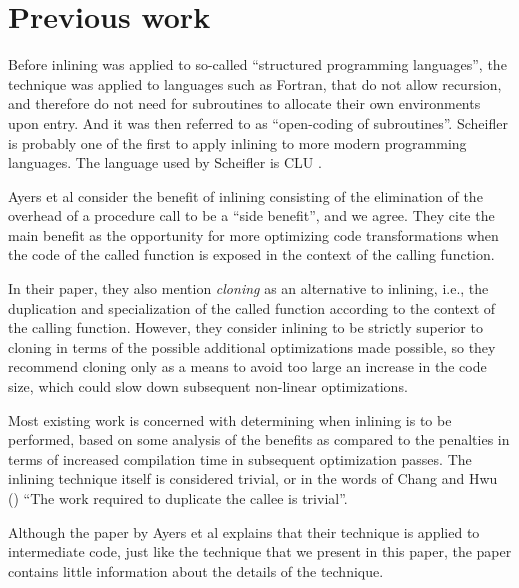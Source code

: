 \section{Previous work}

Before inlining was applied to so-called ``structured programming
languages'', the technique was applied to languages such as Fortran,
that do not allow recursion, and therefore do not need for subroutines
to allocate their own environments upon entry.  And it was then
referred to as ``open-coding of subroutines''.  Scheifler
\cite{Scheifler:1977:AIS:359810.359830} is probably one of the first
to apply inlining to more modern programming languages.  The language
used by Scheifler is CLU \cite{Liskov:1977:AMC:359763.359789}.

Ayers et al \cite{Ayers:1997:AI:258915.258928} consider the benefit of
inlining consisting of the elimination of the overhead of a procedure
call to be a ``side benefit'', and we agree.  They cite the main
benefit as the opportunity for more optimizing code transformations
when the code of the called function is exposed in the context of the
calling function.

In their paper, they also mention \emph{cloning} as an alternative to
inlining, i.e., the duplication and specialization of the called
function according to the context of the calling function.  However,
they consider inlining to be strictly superior to cloning in terms of
the possible additional optimizations made possible, so they recommend
cloning only as a means to avoid too large an increase in the code
size, which could slow down subsequent non-linear optimizations.

Most existing work is concerned with determining when inlining is to
be performed, based on some analysis of the benefits as compared to
the penalties in terms of increased compilation time in subsequent
optimization passes.  The inlining technique itself is considered
trivial, or in the words of Chang and Hwu
(\cite{Chang:1989:IFE:73141.74840, Chang:1989:IFE:74818.74840}) ``The
work required to duplicate the callee is trivial''.

Although the paper by Ayers et al explains that their technique is
applied to intermediate code, just like the technique that we present
in this paper, the paper contains little information about the details
of the technique.

